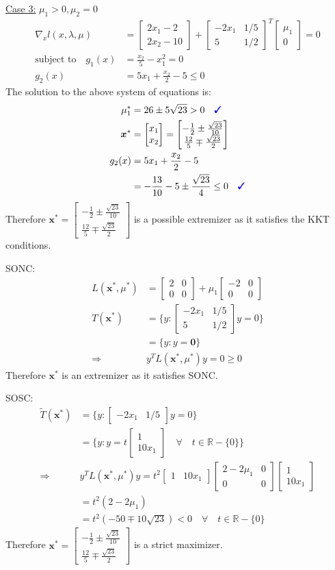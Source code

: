 \documentclass[a4paper,11pt]{article}
\newcommand{\V}[1]{\boldsymbol{#1}}
\newcommand{\mat}[1]{\begin{bmatrix}#1\end{bmatrix}}
\newcommand{\cmark}{{\color{blue}\text{\ding{51}}}}%
\begin{document}
\noindent\underline{Case 3:} $\mu_1>0,\mu_2=0$ 
\begin{align*}
 \nabla_x l(x,\lambda,\mu) &= \mat{2x_1 -2\\ 2x_2-10} +\mat{-2x_1 & 1/5\\ 5& 1/2}^T\mat{\mu_1\\ 0} =0\\
 \text{subject to}\quad g_1(x)&=\frac{x_2}{5}-x_1^2 = 0\\
 g_2(x)&=5x_1 +\frac{x_2}{2}-5\leq 0
\end{align*}
The solution to the above system of equations is:
\begin{align*}
\mu_1^*&= 26\pm5\sqrt{23} >0 \quad \cmark\\
 \V{x}^* &= \mat{x_1\\x_2}=\mat{-\frac{1}{2}\pm\frac{\sqrt{23}}{10}\\ \frac{12}{5}\mp\frac{\sqrt{23}}{2}}\\
%  
 g_2(x)&= 5x_1 +\frac{x_2}{2}-5 \\
 &= -\frac{13}{10}-5 \pm\frac{\sqrt{23}}{4} \leq 0 \quad\cmark
\end{align*}
Therefore $\V{x}^*= \mat{-\frac{1}{2}\pm\frac{\sqrt{23}}{10}\\ \frac{12}{5}\mp\frac{\sqrt{23}}{2}}$ is a possible extremizer as it satisfies the KKT conditions.

\noindent SONC:
\begin{align*}
 L(\V{x}^*,\mu^*)& = \mat{2&0\\0&0} +\mu_1\mat{-2 & 0\\ 0& 0}\\
 T(\V{x}^*)& = \{y: \mat{-2x_1 & 1/5\\5&1/2}y = 0\}\\
 & = \{y: y=\V{0}\}\\
 \Rightarrow& y^TL(\V{x}^*,\mu^*)y = 0 \geq 0
\end{align*}
Therefore $\V{x}^*$ is an extremizer as it satisfies SONC.

\noindent SOSC:
\begin{align*}
 \tilde{T}(\V{x}^*)& = \{y: \mat{-2x_1& 1/5}y=0\}\\
 & = \{y: y=t\mat{1\\10x_1} \quad \forall \quad t\in \mathbb{R}-\{0\}\}\\
 \Rightarrow& y^TL(\V{x}^*,\mu^*)y = t^2\mat{1&10x_1} \mat{2-2\mu_1&0\\0&0}  \mat{1\\10x_1}\\
 & = t^2(2-2\mu_1)\\
 & = t^2(-50\mp10\sqrt{23})< 0 \quad \forall \quad t\in \mathbb{R}-\{0\}
\end{align*}
Therefore $\V{x}^*=\mat{-\frac{1}{2}\pm\frac{\sqrt{23}}{10}\\ \frac{12}{5}\mp\frac{\sqrt{23}}{2}}$ is a strict maximizer. 
\end{document}
